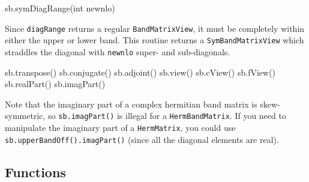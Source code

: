 \documentclass[twoside,letterpaper,11pt]{article}
\renewcommand{\tt}[1]{{\lstinline {#1}}}
\begin{document}
\begin{tmvcode}
sb.symDiagRange(int newnlo)
\end{tmvcode}
Since \tt{diagRange} returns a regular \tt{BandMatrixView}, it must be completely
within either the upper or lower band.  This routine returns a \tt{SymBandMatrixView}
which straddles the diagonal with \tt{newnlo} super- and sub-diagonals.

\begin{tmvcode}
sb.transpose()
sb.conjugate()
sb.adjoint()
sb.view()
sb.cView()
sb.fView()
sb.realPart()
sb.imagPart()
\end{tmvcode}
Note that the imaginary part of a complex hermitian band matrix is
skew-symmetric, so \tt{sb.imagPart()} is illegal for a \tt{HermBandMatrix}.
If you need to manipulate the imaginary part of a \tt{HermMatrix}, 
you could use
\tt{sb.upperBandOff().imagPart()} 
(since all the diagonal elements are real).
\vspace{12pt}

\subsection{Functions}
\label{SymBandMatrix_Functions}
\end{document}

